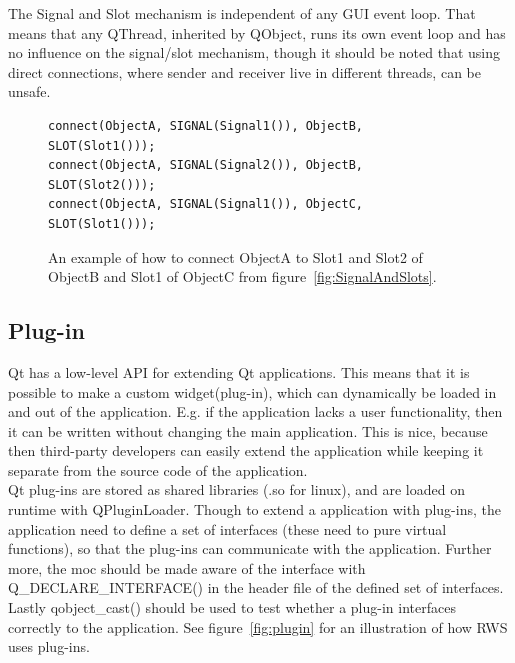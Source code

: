 The Signal and Slot mechanism is independent of any GUI event loop. That means that any QThread, inherited by QObject, runs its own event loop and  has no influence on the signal/slot mechanism, though it should be noted that using direct connections, where sender and receiver live in different threads, can be unsafe.

\begin{figure}[h]
\centering
\lstset{language=C++} 
\begin{lstlisting}[frame=single]  
connect(ObjectA, SIGNAL(Signal1()), ObjectB, SLOT(Slot1()));
connect(ObjectA, SIGNAL(Signal2()), ObjectB, SLOT(Slot2()));
connect(ObjectA, SIGNAL(Signal1()), ObjectC, SLOT(Slot1()));
\end{lstlisting}
\caption{An example of how to connect ObjectA to Slot1 and Slot2 of ObjectB and Slot1 of ObjectC from figure~\ref{fig:SignalAndSlots}.}
\label{fig:connect} 	
\end{figure}


\subsection{Plug-in}
\label{sec:plugin}
Qt has a low-level API for extending Qt applications. This means that it is possible to make a custom widget(plug-in), which can dynamically be loaded in and out of the application. E.g. if the application lacks a user functionality, then it can be written without changing the main application. This is nice, because then third-party developers can easily extend the application while keeping it separate from the source code of the application.\\

Qt plug-ins are stored as shared libraries (.so for linux), and are loaded on runtime with QPluginLoader. Though to extend a application with plug-ins, the application need to define a set of interfaces (these need to pure virtual functions), so that the plug-ins can communicate with the application. Further more, the moc should be made aware of the interface with Q\_DECLARE\_INTERFACE() in the header file of the defined set of interfaces. Lastly qobject\_cast() should be used to test whether a plug-in interfaces correctly to the application. See figure~\ref{fig:plugin} for an illustration of how RWS uses plug-ins.\\


